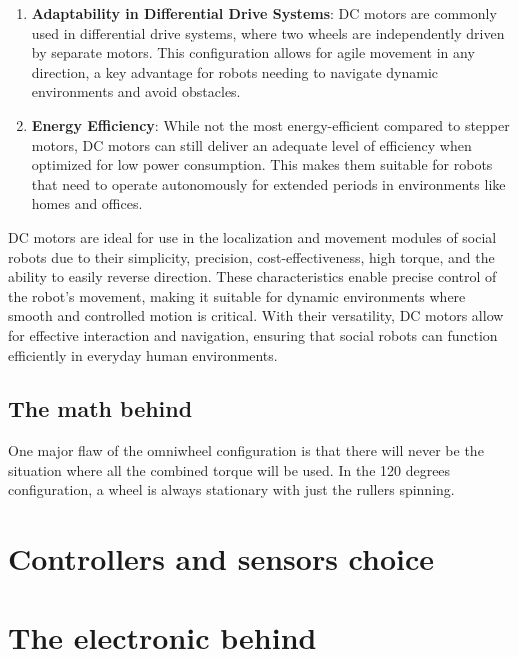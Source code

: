 \documentclass{article}
\begin{document}
\begin{enumerate}
    \item \textbf{Adaptability in Differential Drive Systems}: DC motors are commonly used in differential drive systems, where two wheels are independently driven by separate motors. This configuration allows for agile movement in any direction, a key advantage for robots needing to navigate dynamic environments and avoid obstacles.
    
    \item \textbf{Energy Efficiency}: While not the most energy-efficient compared to stepper motors, DC motors can still deliver an adequate level of efficiency when optimized for low power consumption. This makes them suitable for robots that need to operate autonomously for extended periods in environments like homes and offices.
\end{enumerate}


DC motors are ideal for use in the localization and movement modules of social robots due to their simplicity, precision, cost-effectiveness, high torque, and the ability to easily reverse direction. These characteristics enable precise control of the robot's movement, making it suitable for dynamic environments where smooth and controlled motion is critical. With their versatility, DC motors allow for effective interaction and navigation, ensuring that social robots can function efficiently in everyday human environments.


\subsection{The math behind}

One major flaw of the omniwheel configuration is that there will never be the situation where all the combined torque will be used. In the 120 degrees configuration, a wheel is always stationary with just the rullers spinning.

\newpage
\section{Controllers and sensors choice} %

\newpage
\section{The electronic behind} %

\newpage
\end{document}
